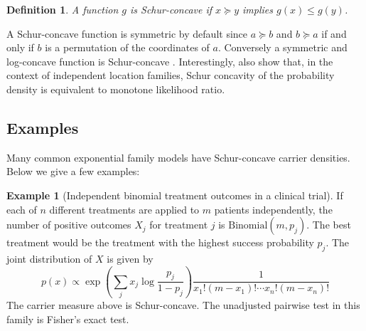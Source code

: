 \documentclass[11pt]{article}
\newtheorem{definition}{Definition}
\theoremstyle{definition}
\newtheorem{example}{Example}
\theoremstyle{custom}
\begin{document}
\begin{definition}
A function $g$ is Schur-concave if $x \succeq y$ implies $g\left(x\right) \le g\left(y\right)$.
\end{definition}

A Schur-concave function is symmetric by default since $a \succeq b$ and $b \succeq a$ if and only if $b$ is a permutation of the coordinates of $a$. Conversely a symmetric and log-concave function is Schur-concave \citep{Marshall:2010hb}. Interestingly, \citet{Gupta:1984fw} also show that, in the context of independent location families, Schur concavity of the probability density is equivalent to monotone likelihood ratio.

\subsection{Examples}

Many common exponential family models have Schur-concave carrier densities. Below we give a few examples:

\begin{example}[Independent binomial treatment outcomes in a clinical trial]
 If each of $n$ different treatments are applied to $m$ patients independently, the number of positive outcomes $X_j$ for treatment $j$ is $\text{Binomial}\left(m, p_j\right)$. The best treatment would be the treatment with the highest success probability $p_j$. The joint distribution of $X$ is given by
\[p\left(x\right) \propto \exp\left(\sum_j x_j \log\frac{p_j}{1-p_j}\right) \frac{1}{x_1! \left(m-x_1\right)! \cdots x_n! \left(m-x_n\right)!}\]
The carrier measure above is Schur-concave. The unadjusted pairwise test in this family is Fisher's exact test.
\end{example}
\end{document}
